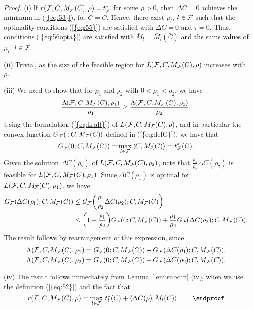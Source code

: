 \documentclass{siamltex}
\begin{document}
{\em Proof}.
  \noindent (i) If $r({{\cal F}},\bar{C},M_{{\cal F}}(\bar{C}),\rho)=t^*_{{\cal F}}$
  for some $\rho>0$, then ${\Delta C}=0$ achieves the minimum in
  {(\ref{{eq:53}})}, for $C=\bar{C}$. Hence, there exist $\mu_l$, $l \in
  {{\cal F}}$ such that the optimality conditions {(\ref{{eq:55}})} are satisfied
  with ${\Delta C}=0$ and $\tau=0$.  Thus, conditions {(\ref{{eq:56opta}})} are
  satisfied with $\bar{M}_l=\bar{M}_l(\bar{C})$ and the same values of
  $\mu_l$, $l \in {{\cal F}}$.

\medskip\noindent (ii) Trivial, as the size of the feasible region for
$L({{\cal F}},C,M_{{\cal F}}(C),\rho)$ increases with $\rho$.

\medskip\noindent (iii) We need to show that for $\rho_1$ and $\rho_2$
with $0 < \rho_1 < \rho_2$, we have
\[
\frac{\Lambda({{\cal F}},C,M_{{\cal F}}(C),\rho_1)}{\rho_1} \ge 
\frac{\Lambda({{\cal F}},C,M_{{\cal F}}(C),\rho_2)}{\rho_2}.
\]
Using the formulation {(\ref{{eq:L.alt}})} of $L({{\cal F}},C,M_{{\cal F}}(C),\rho)$,
and in particular the convex function $G_{{\cal F}}(\cdot;C,M_{{\cal F}}(C))$
defined in {(\ref{{eq:defG}})}, we have that
\[
G_{{\cal F}}(0;C,M_{{\cal F}}(C)) = \max_{l \in {{\cal F}}} \, \langle C , M_l(C) \rangle = t^*_{{\cal F}}(C).
\]
Given the solution ${\Delta C}(\rho_2)$ of $L({{\cal F}},C,M_{{\cal F}}(C),\rho_2)$, note
that $\frac{\rho_1}{\rho_2} {\Delta C}(\rho_2)$ is feasible for
$L({{\cal F}},C,M_{{\cal F}}(C),\rho_1)$. Since ${\Delta C}(\rho_1)$ is optimal for
$L({{\cal F}},C,M_{{\cal F}}(C),\rho_1)$, we have
\begin{align*}
G_{{\cal F}}({\Delta C}(\rho_1);C,M_{{\cal F}}(C)) 
& \le G_{{\cal F}}\!\left( \frac{\rho_1}{\rho_2} {\Delta C}(\rho_2); C,M_{{\cal F}}(C) \right) \\
& \le \left( 1-\frac{\rho_1}{\rho_2} \right)\!G_{{\cal F}} (0;C,M_{{\cal F}}(C)) + 
\frac{\rho_1}{\rho_2} G_{{\cal F}}({\Delta C}(\rho_2);C,M_{{\cal F}}(C)).
\end{align*}
The result follows by rearrangement of this expression, since 
\begin{align*}
\Lambda({{\cal F}},C,M_{{\cal F}}(C),\rho_1) &= G_{{\cal F}}(0;C,M_{{\cal F}}(C)) 
- G_{{\cal F}}({\Delta C}(\rho_1);C,M_{{\cal F}}(C)), \\
\Lambda({{\cal F}},C,M_{{\cal F}}(C),\rho_2) &= G_{{\cal F}}(0;C,M_{{\cal F}}(C)) - 
G_{{\cal F}}({\Delta C}(\rho_2);C,M_{{\cal F}}(C)).
\end{align*}

\medskip\noindent (iv) The result follows immediately from
Lemma~\ref{lem:subdiff} (iv), when we use the definition {(\ref{{eq:52}})} and
the fact that
\[
r({{\cal F}},C,M_{{\cal F}}(C),\rho) = \max_{l \in {{\cal F}}} \, t^*_l(C) + \langle {\Delta C}(\rho), M_l(C) \rangle. \qquad\endproof
\]
\end{document}
